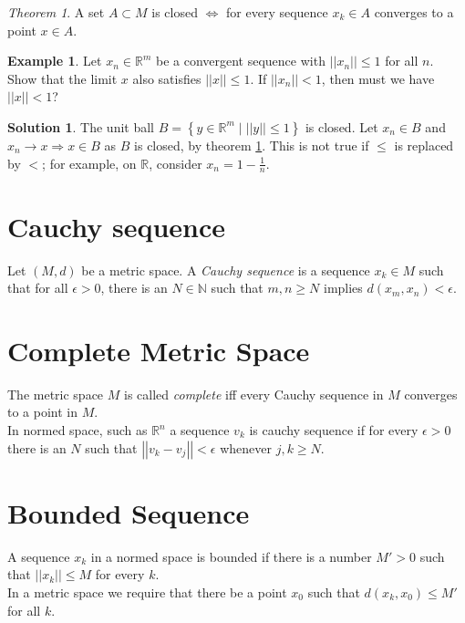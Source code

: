 \documentclass[12pt,oneside,a4paper]{book}
\newcommand{\R}{\mathds{R}}
\newcommand{\N}{\mathds{N}}
\newcommand{\norm}[1]{\left\vert\left\vert#1\right\vert\right\vert}
\newcommand{\set}[1]{\left\{#1\right\}}
\theoremstyle{remark}
\newtheorem{thm}{Theorem}[section]
\theoremstyle{definition}
\newtheorem*{ex}{Example}
\newtheorem*{soln}{Solution}
\begin{document}
\begin{thm}
    A set $ A\subset M $ is closed $ \Leftrightarrow $ for every sequence $ x_k\in A $ converges to a point $ x\in A $.\label{thm:seq}
\end{thm}
\begin{ex}
    Let $ x_n \in \R^m $ be a convergent sequence with $ \norm{x_n}\leq1 $ for all $ n $. Show that the limit $ x $ also satisfies $ \norm{x}\leq1 $. If $ \norm{x_n}<1 $, then must we have $ \norm{x}<1 $? 
\end{ex}
\begin{soln}
    The unit ball $ B=\set{y\in \R^m\mid \norm{y}\leq 1} $ is closed. Let $ x_n\in B $ and $ x_n\to x \Rightarrow x\in B $ as $ B $ is closed, by theorem \ref{thm:seq}. This is not true if $ \leq $ is replaced by $ < $; for example, on $ \R $, consider $ x_n=1-\frac{1}{n} $.
\end{soln}
\section{Cauchy sequence}
Let $ (M,d) $ be a metric space. A \emph{Cauchy sequence} is a sequence $ x_k\in M $ such that for all $ \epsilon>0 $, there is an $ N\in\N $ such that $ m,n\geq N $ implies $ d(x_m,x_n)<\epsilon $.
\section{Complete Metric Space}
The metric space $ M $ is called \emph{complete} iff every Cauchy sequence in $ M $ converges to a point in $ M $.\\

In normed space, such as $ \R^n $ a sequence $ v_k $ is cauchy sequence if for every $ \epsilon>0 $ there is an $ N $ such that $ \norm{v_k-v_j}<\epsilon $ whenever $ j,k\geq N $.
\section{Bounded Sequence} 
A sequence $ x_k $ in a normed space is bounded if there is a number $ M'>0 $ such that $ \norm{x_k}\leq M $ for every $ k $.\\

In a metric space we require that there be a point $ x_0 $ such that $ d(x_k,x_0)\leq M' $ for all $ k $.
\end{document}
